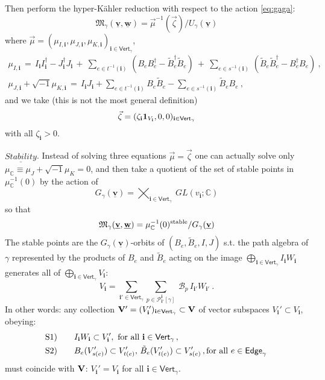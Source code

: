 \documentclass[12pt]{amsart}
\newcommand {\3}{\underline{\bf 3}}
\newcommand {\4}{\underline{\bf 4}}
\newcommand {\6}{\underline{\bf 6}}
\newcommand{\beq}{\begin{equation}}
\newcommand{\eeq}{\end{equation}}
\newcommand{\mM}{{\mathfrak M}}
\newcommand {\BC}   {\mathbb C}
\newcommand {\ib} {\mathbf{i}}
\newcommand {\bv} {\underline{\mathbf{v}}}
\newcommand {\bw} {\underline{\mathbf{w}}}
\newcommand {\CalB} {\mathcal B}
\newcommand {\CalP} {\mathcal P}
\newcommand{\Vg}{\mathsf{Vert}_{\gamma}}
\newcommand{\Eg}{\mathsf{Edge}_{\gamma}}
\begin{document}
Then perform the hyper-K\"ahler reduction with respect to the action \eqref{eq:gaga}:
\beq
{\mM}_{\gamma} ({\bv} ,{\bw}) = {\vec\mu}^{-1} ({\vec\zeta}) /U_{\gamma}({\bv})
\label{eq:hkq}
\eeq
where ${\vec\mu} = ({\mu}_{I, \ib}, {\mu}_{J, \ib}, {\mu}_{K, \ib})_{\ib \in \Vg}$, 
\begin{multline}
{\mu}_{I, \ib} \, = \, I_{\ib} I_{\ib}^{\dagger} - J_{\ib}^{\dagger} J_{\ib}  \, + \ \sum_{e \in t^{-1}({\ib})} \, \left( B_{e} B_{e}^{\dagger} - {\tilde B}_{e}^{\dagger} {\tilde B}_{e} \right) \ + \ \sum_{e \in s^{-1}({\ib})}\, \left(  {\tilde B}_{e} {\tilde B}_{e}^{\dagger} - B_{e}^{\dagger} B_{e} 
\right)  \ , \\
{\mu}_{J, \ib} + \sqrt{-1} {\mu}_{K, \ib} \, = \, I_{\ib} J_{\ib} + \sum_{e \in t^{-1}({\ib})} B_{e} {\tilde B}_{e} - \sum_{e \in s^{-1}({\ib})} {\tilde B}_{e}  B_{e} 
\ ,
\end{multline}
and we take (this is not the most general definition)
\beq
{\vec\zeta} = ({\zeta}_{\ib} {\bf 1}_{V_{\ib}}, 0 , 0)_{\ib \in \Vg}
\label{eq:lev}
\eeq 
with all 
$\zeta_{\ib} > 0$. 

$\underline{Stability}$. 
Instead of solving three equations ${\vec\mu} = {\vec\zeta}$ one can actually solve only ${\mu}_{\BC} \equiv {\mu}_{J} + \sqrt{-1} {\mu}_{K} = 0$, and then take a quotient of the set of stable points in ${\mu}_{\BC}^{-1}(0)$ by the action of 
\beq
G_{\gamma} ({\bv}) = \varprod_{\ib \in {\Vg}}\ GL(v_{\ib}; {\BC})
\label{eq:gbv}
\eeq
so that
\beq
{\mM}_{\gamma} ({\bv}, {\bw}) = {\mu}_{\BC}^{-1}(0)^{\rm stable}/ G_{\gamma}({\bv})
\label{eq:stb}
\eeq
The stable points are the $G_{\gamma}({\bv})$-orbits of $(B_{e}, {\tilde B}_{e}, I, J)$ s.t.
the path algebra of $\gamma$ represented by the products of $B_{e}$ and ${\tilde B}_{e}$ 
acting on the image $\bigoplus_{\ib \in \Vg} I_{\ib}W_{\ib}$ generates all of $\bigoplus_{\ib\in \Vg} V_{\ib}$:
\beq
V_{\ib} = \sum_{{\ib}' \in \Vg} \sum_{p \in {\CalP}_{{\ib}'}^{\ib}[{\gamma}]} \ {\CalB}_{p}  \, I_{\ib'} W_{\ib'}\ .
\label{eq:vib}
\eeq
In other words: any collection ${\bf V}' = (V_{\ib}')_{{\ib} \in {\Vg}} \subset {\bf V}$ of vector subspaces $V_{\ib}' \subset V_{\ib}$, obeying: 
\beq
\begin{aligned}
& {\rm S1)} \qquad I_{\ib}W_{\ib} \subset V_{{\ib}}', \ {\rm for\ all}\ \ib \in \Vg \, , \\
&  {\rm S2)}\qquad  B_{e}(V_{s(e)}') \subset V_{t(e)}', \, {\tilde B}_{e}(V_{t(e)}') \subset V_{s(e)}' \,  , {\rm  for\ all}\ e \in \Eg \, \\
\end{aligned}
\label{eq:vv'}
\eeq must coincide with ${\bf V}$:
$V_{\ib}' = V_{\ib}$ for all ${\ib} \in {\Vg}$. 
\end{document}
